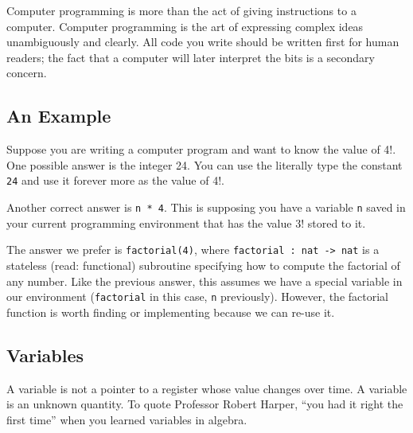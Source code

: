 \documentclass{article}
\begin{document}
\maketitle

Computer programming is more than the act of giving instructions to a computer.
Computer programming is the art of expressing complex ideas unambiguously and clearly.
All code you write should be written first for human readers; the fact that a computer will later interpret the bits is a secondary concern.

\subsection*{An Example}
Suppose you are writing a computer program and want to know the value of 4!.
One possible answer is the integer 24.
You can use the literally type the constant \texttt{24} and use it forever more as the value of 4!.

Another correct answer is \texttt{n * 4}.
This is supposing you have a variable \texttt{n} saved in your current programming environment that has the value 3! stored to it.

The answer we prefer is \texttt{factorial(4)}, where \texttt{factorial : nat -> nat} is a stateless (read: functional) subroutine specifying how to compute the factorial of any number.
Like the previous answer, this assumes we have a special variable in our environment (\texttt{factorial} in this case, \texttt{n} previously).
However, the factorial function is worth finding or implementing because we can re-use it.

\subsection*{Variables}
A variable is not a pointer to a register whose value changes over time.
A variable is an unknown quantity.
To quote Professor Robert Harper, ``you had it right the first time'' when you learned variables in algebra.
\end{document}
